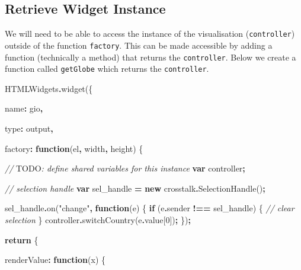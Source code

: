 \documentclass[
]{krantz}
\makeatletter
\newenvironment{Shaded}{\begin{snugshade}}{\end{snugshade}}
\newcommand{\AlertTok}[1]{\textcolor[rgb]{0.33,0.33,0.33}{#1}}
\newcommand{\AttributeTok}[1]{\textcolor[rgb]{0.61,0.61,0.61}{#1}}
\newcommand{\CommentTok}[1]{\textcolor[rgb]{0.37,0.37,0.37}{\textit{#1}}}
\newcommand{\ControlFlowTok}[1]{\textcolor[rgb]{0.27,0.27,0.27}{\textbf{#1}}}
\newcommand{\DataTypeTok}[1]{\textcolor[rgb]{0.27,0.27,0.27}{#1}}
\newcommand{\DecValTok}[1]{\textcolor[rgb]{0.06,0.06,0.06}{#1}}
\newcommand{\FunctionTok}[1]{\textcolor[rgb]{0,0,0}{#1}}
\newcommand{\KeywordTok}[1]{\textcolor[rgb]{0.27,0.27,0.27}{\textbf{#1}}}
\newcommand{\NormalTok}[1]{#1}
\newcommand{\OperatorTok}[1]{\textcolor[rgb]{0.43,0.43,0.43}{\textbf{#1}}}
\newcommand{\StringTok}[1]{\textcolor[rgb]{0.5,0.5,0.5}{#1}}
\newenvironment{kframe}{%
\medskip{}
\setlength{\fboxsep}{.8em}
 \def\at@end@of@kframe{}%
 \ifinner\ifhmode%
  \def\at@end@of@kframe{\end{minipage}}%
  \begin{minipage}{\columnwidth}%
 \fi\fi%
 \def\FrameCommand##1{\hskip\@totalleftmargin \hskip-\fboxsep
 \colorbox{shadecolor}{##1}\hskip-\fboxsep
     \hskip-\linewidth \hskip-\@totalleftmargin \hskip\columnwidth}%
 \MakeFramed {\advance\hsize-\width
   \@totalleftmargin\z@ \linewidth\hsize
   \@setminipage}}%
 {\par\unskip\endMakeFramed%
 \at@end@of@kframe}
\renewenvironment{Shaded}{\begin{kframe}}{\end{kframe}}
\makeatother
\begin{document}
\hypertarget{shiny-widgets-retrieve}{%
\subsection{Retrieve Widget Instance}\label{shiny-widgets-retrieve}}

We will need to be able to access the instance of the visualisation (\texttt{controller}) outside of the function \texttt{factory}. This can be made accessible by adding a function (technically a method) that returns the \texttt{controller}. Below we create a function called \texttt{getGlobe} which returns the \texttt{controller}.

\begin{Shaded}
\begin{Highlighting}[]
\NormalTok{HTMLWidgets}\OperatorTok{.}\FunctionTok{widget}\NormalTok{(\{}

  \DataTypeTok{name}\OperatorTok{:} \StringTok{\textquotesingle{}gio\textquotesingle{}}\OperatorTok{,}

  \DataTypeTok{type}\OperatorTok{:} \StringTok{\textquotesingle{}output\textquotesingle{}}\OperatorTok{,}

  \DataTypeTok{factory}\OperatorTok{:} \KeywordTok{function}\NormalTok{(el}\OperatorTok{,}\NormalTok{ width}\OperatorTok{,}\NormalTok{ height) \{}

    \CommentTok{// }\AlertTok{TODO}\CommentTok{: define shared variables for this instance}
    \KeywordTok{var}\NormalTok{ controller}\OperatorTok{;}

    \CommentTok{// selection handle}
    \KeywordTok{var}\NormalTok{ sel\_handle }\OperatorTok{=} \KeywordTok{new}\NormalTok{ crosstalk}\OperatorTok{.}\FunctionTok{SelectionHandle}\NormalTok{()}\OperatorTok{;}

\NormalTok{    sel\_handle}\OperatorTok{.}\FunctionTok{on}\NormalTok{(}\StringTok{"change"}\OperatorTok{,} \KeywordTok{function}\NormalTok{(e) \{}
      \ControlFlowTok{if}\NormalTok{ (e}\OperatorTok{.}\AttributeTok{sender} \OperatorTok{!==}\NormalTok{ sel\_handle) \{}
        \CommentTok{// clear selection}
\NormalTok{      \}}
\NormalTok{      controller}\OperatorTok{.}\FunctionTok{switchCountry}\NormalTok{(e}\OperatorTok{.}\AttributeTok{value}\NormalTok{[}\DecValTok{0}\NormalTok{])}\OperatorTok{;}
\NormalTok{    \})}\OperatorTok{;}


    \ControlFlowTok{return}\NormalTok{ \{}

      \DataTypeTok{renderValue}\OperatorTok{:} \KeywordTok{function}\NormalTok{(x) \{}


\end{Highlighting}
\end{Shaded}
\end{document}
